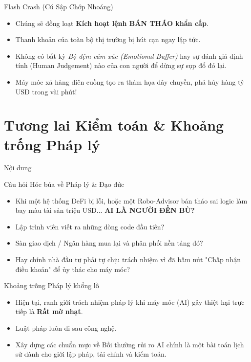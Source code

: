 \documentclass[aspectratio=169, 12pt]{beamer}
\begin{document}
\begin{frame}{Flash Crash (Cú Sập Chớp Nhoáng)}
    \begin{itemize}
        \item Chúng sẽ đồng loạt \textbf{Kích hoạt lệnh BÁN THÁO khẩn cấp}.
        \item Thanh khoản của toàn bộ thị trường bị hút cạn ngay lập tức.
        \item Không có bất kỳ \textit{Bộ đệm cảm xúc (Emotional Buffer)} hay sự đánh giá định tính (Human Judgement) nào của con người để dừng sự sụp đổ đó lại.
        \item Máy móc xả hàng điên cuồng tạo ra thảm họa dây chuyền, phá hủy hàng tỷ USD trong vài phút!
    \end{itemize}
\end{frame}

\section{Tương lai Kiểm toán \& Khoảng trống Pháp lý}

\begin{frame}{Nội dung}
    \tableofcontents[currentsection]
\end{frame}

\begin{frame}{Câu hỏi Hóc búa về Pháp lý \& Đạo đức}
    \begin{itemize}
        \item Khi một hệ thống DeFi bị lỗi, hoặc một Robo-Advisor bán tháo sai logic làm bay màu tài sản triệu USD... \textbf{AI LÀ NGƯỜI ĐỀN BÙ?}
        \item Lập trình viên viết ra những dòng code đầu tiên?
        \item Sàn giao dịch / Ngân hàng mua lại và phân phối nền tảng đó?
        \item Hay chính nhà đầu tư phải tự chịu trách nhiệm vì đã bấm nút "Chấp nhận điều khoản" để ủy thác cho máy móc?
    \end{itemize}
\end{frame}

\begin{frame}{Khoảng trống Pháp lý khổng lồ}
    \begin{itemize}
        \item Hiện tại, ranh giới trách nhiệm pháp lý khi máy móc (AI) gây thiệt hại trực tiếp là \textbf{Rất mờ nhạt}.
        \item Luật pháp luôn đi sau công nghệ.
        \item Xây dựng các chuẩn mực về Bồi thường rủi ro AI chính là một bài toán lịch sử dành cho giới lập pháp, tài chính và kiểm toán.
    \end{itemize}
\end{frame}
\end{document}
